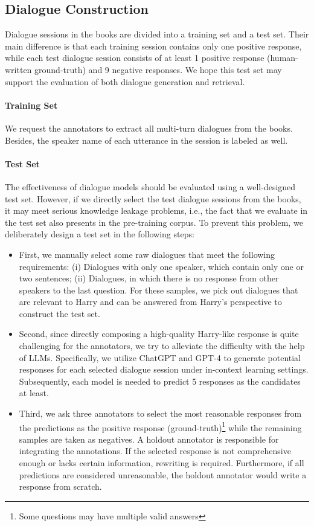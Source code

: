 \documentclass[11pt]{article}
\begin{document}
\subsection{Dialogue Construction}
\label{dialogues}

Dialogue sessions in the books are divided into a training set and a test set. Their main difference is that each training session contains only one positive response, while each test dialogue session consists of at least 1 positive response (human-written ground-truth) and 9 negative responses. We hope this test set may support the evaluation of both dialogue generation and retrieval.

\paragraph{Training Set} We request the annotators to extract all multi-turn dialogues from the books. Besides, the speaker name of each utterance in the session is labeled as well.

\paragraph{Test Set} The effectiveness of dialogue models should be evaluated using a well-designed test set. However, if we directly select the test dialogue sessions from the books, it may meet serious knowledge leakage problems, i.e., the fact that we evaluate in the test set also presents in the pre-training corpus. To prevent this problem, we deliberately design a test set in the following steps:


\begin{itemize}
    \item First, we manually select some raw dialogues that meet the following requirements: (i) Dialogues with only one speaker, which contain only one or two sentences; (ii) Dialogues, in which there is no response from other speakers to the last question. For these samples, we pick out dialogues that are relevant to Harry and can be answered from Harry's perspective to construct the test set.
    \item Second, since directly composing a high-quality Harry-like response is quite challenging for the annotators, we try to alleviate the difficulty with the help of LLMs. Specifically, we utilize ChatGPT and GPT-4  to generate potential responses for each selected dialogue session under in-context learning settings. Subsequently, each model is needed to predict 5 responses as the candidates at least.
\item Third, we ask three annotators to select the most reasonable responses from the predictions as the positive response (ground-truth)\footnote{Some questions may have multiple valid answers} while the remaining samples are taken as negatives. A holdout annotator is responsible for integrating the annotations. If the selected response is not comprehensive enough or lacks certain information, rewriting is required.
    Furthermore, if all predictions are considered unreasonable, the holdout annotator would write a response from scratch.
\end{itemize}
\end{document}
